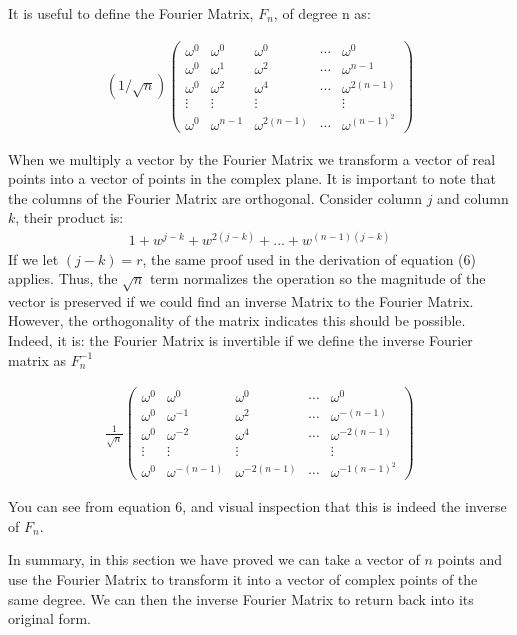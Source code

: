 \documentclass[DIV=calc, paper=a4, fontsize=11pt, twocolumn]{scrartcl}   %
\begin{document}
It is useful to define the Fourier Matrix, $F_{n}$, of degree n as:

\begin{align}
 (1/\sqrt n)
 \begin{pmatrix}
  \omega^0 & \omega^0 & \omega^0 & \cdots & \omega^0 \\
  \omega^0  & \omega^1 & \omega^2 &  \cdots &  \omega^{n-1} \\
   \omega^0  & \omega^2 & \omega^4 &  \cdots &  \omega^{2(n-1)} \\
  \vdots  & \vdots  & \vdots &   & \vdots  \\
  \omega^0  & \omega^{n-1} & \omega^{2(n-1)} & \cdots & \omega^{{(n-1)}^2}
 \end{pmatrix}
\end{align}

When we multiply a vector by the Fourier Matrix we transform a vector of real points into a vector of points in the complex plane. It is important to note that the columns of the Fourier Matrix are orthogonal. Consider column $j$ and column $k$, their product is:
\begin{align}
1 + w^{j-k} +w^{2(j-k)}+...+w^{(n-1)(j-k)}
\end{align}
If we let $(j-k) = r$, the same proof used in the derivation of equation (6) applies. Thus, the $\sqrt{n}$ term normalizes the operation so the magnitude of the vector is preserved if we could find an inverse Matrix to the Fourier Matrix. However, the orthogonality of the matrix indicates this should be possible. Indeed, it is: the Fourier Matrix is invertible if we define the inverse Fourier matrix as $F_{n}^{-1}$

\begin{align}
\frac{1}{\sqrt n}
 \begin{pmatrix}
  \omega^0 & \omega^0 & \omega^0 & \cdots & \omega^0 \\
  \omega^0  & \omega^{-1} & \omega^2 &  \cdots &  \omega^{-(n-1)} \\
   \omega^0  & \omega^{-2} & \omega^4 &  \cdots &  \omega^{-2(n-1)} \\
  \vdots  & \vdots  & \vdots &   & \vdots  \\
  \omega^0  & \omega^{-(n-1)} & \omega^{-2(n-1)} & \cdots & \omega^{{-1(n-1)}^2}
 \end{pmatrix}
\end{align}

You can see from equation 6, and visual inspection that this is indeed the inverse of $F_{n}$.
\par In summary, in this section we have proved we can take a vector of $n$ points and use the Fourier Matrix to transform it into a vector of complex points of the same degree. We can then the inverse Fourier Matrix to return back into its original form.
\end{document}
